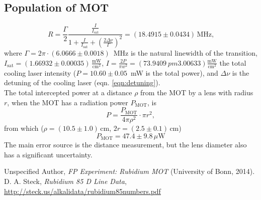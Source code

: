 \documentclass[twocolumn]{article}
\begin{document}
\subsection{Population of MOT}
\begin{equation}
R = \frac{\Gamma}{2} \frac{\frac{I}{I_{\text{sat}}}}{1 + \frac{I}{I_{\text{sat}}} + \left( \frac{2 \Delta \nu}{\Gamma} \right)^2} = (18.4915 \pm 0.0434)\, \text{MHz,}
\end{equation}
where $\Gamma = 2 \pi \cdot (6.0666 \pm 0.0018)$~MHz is the natural linewidth of the transition, $I_{\text{sat}} = (1.66932 \pm 0.00035)\, \frac{\text{mW}}{\text{cm}^2}$, $I = \frac{2 P}{\pi w^2} = (73.9409 \ pm 3.00633) \frac{\text{mW}}{\text{cm}^2}$ the total cooling laser intensity ($P = 10.60 \pm 0.05$~mW is the total power), and $\Delta \nu$ is the detuning of the cooling laser (eqn. \ref{eqn:detuning}).\\
The total intercepted power at a distance $\rho$ from the MOT by a lens with radius $r$, when the MOT has a radiation power $P_{\text{MOT}}$, is 
\begin{equation}
P = \frac{P_{\text{MOT}}}{4 \pi \rho^2} \cdot \pi r^2, \nonumber
\end{equation}
from which ($\rho = (10.5 \pm 1.0) \,$cm, $2r = (2.5\pm 0.1) \,$cm)
\begin{equation}
P_{\text{MOT}} = 47.4 \pm 9.8 \, \text{$\mu$W}
\end{equation}
The main error source is the distance measurement, but the lens diameter also has a significant uncertainty.
\begin{thebibliography}{9}
Unspecified Author, \textsl{FP Experiment: Rubidium MOT} (University of Bonn, 2014).
D. A. Steck, \textsl{Rubidium 85 D Line Data}, \url{http://steck.us/alkalidata/rubidium85numbers.pdf}
\end{thebibliography}
\end{document}
